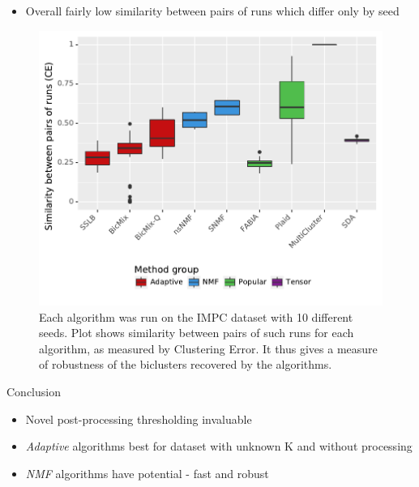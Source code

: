 \documentclass[xcolor=table,final]{beamer}
\newlength{\onecolwid}
\begin{document}
\begin{frame}[t]
\begin{columns}[t]
\begin{column}{\onecolwid}
\begin{itemize}
    \item Overall fairly low similarity between pairs of runs which differ only by seed
\end{itemize}

\begin{figure}
\includegraphics[width=0.9 \textwidth]{plots/similarity_methods_K.pdf}
\caption{Each algorithm was run on the IMPC dataset with 10 different seeds. Plot shows similarity between pairs of such runs for each algorithm, as measured by Clustering Error. It thus gives a measure of robustness of the biclusters recovered by the algorithms.}
\end{figure}


\begin{block}{Conclusion}

\begin{itemize}
    \item Novel post-processing thresholding invaluable
    \item \textit{Adaptive} algorithms best for dataset with unknown K and without processing
    \item \textit{NMF} algorithms have potential - fast and robust
\end{itemize}

\end{block}



\end{column}
\end{columns}
\end{frame}
\end{document}
